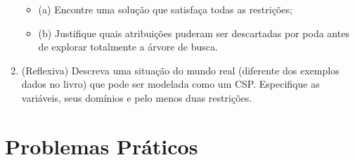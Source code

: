 \documentclass{article}
\begin{document}
\begin{enumerate}
    \begin{itemize}
        \item (a) Encontre uma solução que satisfaça todas as restrições;
        \item (b) Justifique quais atribuições puderam ser descartadas por poda antes de explorar totalmente a árvore de busca.
    \end{itemize}

    \item (Reflexiva) Descreva uma situação do mundo real (diferente dos exemplos dados no livro) que pode ser modelada como um CSP. Especifique as variáveis, seus domínios e pelo menos duas restrições.

\end{enumerate}

\section{Problemas Práticos}
\end{document}
